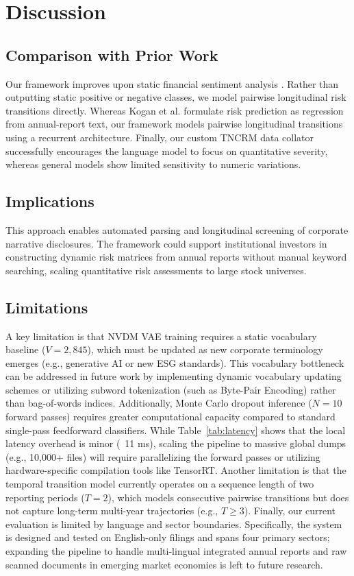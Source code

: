 \documentclass[journal]{IEEEtran}
\begin{document}
\section{Discussion}

\subsection{Comparison with Prior Work}
Our framework improves upon static financial sentiment analysis \cite{araci2019, loughran2011}. Rather than outputting static positive or negative classes, we model pairwise longitudinal risk transitions directly. Whereas Kogan et al. \cite{kogan2009} formulate risk prediction as regression from annual-report text, our framework models pairwise longitudinal transitions using a recurrent architecture. Finally, our custom TNCRM data collator successfully encourages the language model to focus on quantitative severity, whereas general models \cite{wallace2019, thawani2021} show limited sensitivity to numeric variations.

\subsection{Implications}
This approach enables automated parsing and longitudinal screening of corporate narrative disclosures. The framework could support institutional investors in constructing dynamic risk matrices from annual reports without manual keyword searching, scaling quantitative risk assessments to large stock universes.

\subsection{Limitations}
A key limitation is that NVDM VAE training requires a static vocabulary baseline ($V=2,845$), which must be updated as new corporate terminology emerges (e.g., generative AI or new ESG standards). This vocabulary bottleneck can be addressed in future work by implementing dynamic vocabulary updating schemes or utilizing subword tokenization (such as Byte-Pair Encoding) rather than bag-of-words indices. Additionally, Monte Carlo dropout inference ($N=10$ forward passes) requires greater computational capacity compared to standard single-pass feedforward classifiers. While Table~\ref{tab:latency} shows that the local latency overhead is minor (~11 ms), scaling the pipeline to massive global dumps (e.g., 10,000+ files) will require parallelizing the forward passes or utilizing hardware-specific compilation tools like TensorRT. Another limitation is that the temporal transition model currently operates on a sequence length of two reporting periods ($T=2$), which models consecutive pairwise transitions but does not capture long-term multi-year trajectories (e.g., $T \ge 3$). Finally, our current evaluation is limited by language and sector boundaries. Specifically, the system is designed and tested on English-only filings and spans four primary sectors; expanding the pipeline to handle multi-lingual integrated annual reports and raw scanned documents in emerging market economies is left to future research.
\end{document}
